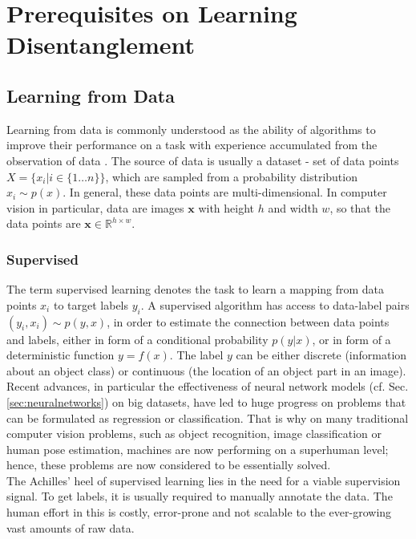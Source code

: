 \chapter{Prerequisites on Learning Disentanglement}\label{sec:prerequisites}

\section{Learning from Data}
	{Learning from data} is commonly understood as the ability of algorithms to improve their performance on a task with experience accumulated from the observation of data \cite{goodfellow16dlb}. The source of data is usually a dataset - set of data points $X = \{x_i | i \in \{1\ldots n\} \}$, which are sampled from a probability distribution $x_i \sim p(x)$.
	In general, these data points are multi-dimensional. In computer vision in particular, data are images $\mathbf{x}$ with height $h$ and width $w$, so that the data points are $\mathbf{x} \in \mathbb{R}^{h \times w}$.

	\subsection{Supervised}\label{sec:supervised}
		The term {supervised learning} denotes the task to learn a mapping from data points $x_i$ to target labels $y_i$.
		A supervised algorithm has access to data-label pairs  $(y_i, x_i) \sim p(y, x)$, in order to estimate the connection between data points and labels, either in form of a conditional probability $p(y|x)$, or in form of a deterministic function $y = f(x)$.
		The label $y$ can be either discrete (\eg information about an object class) or continuous (\eg the location of an object part in an image).
		Recent advances, in particular the effectiveness of neural network models (cf. Sec. \ref{sec:neuralnetworks}) on big datasets, have led to huge progress on problems that can be formulated as regression or classification. That is why on many traditional computer vision problems, such as object recognition, image classification or human pose estimation, machines are now performing on a superhuman level; hence, these problems are now considered to be essentially solved.\\
		The Achilles' heel of supervised learning lies in the need for a viable supervision signal. To get labels, it is usually required to manually annotate the data. The human effort in this is costly, error-prone and not scalable to the ever-growing vast amounts of raw data.

